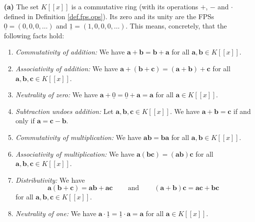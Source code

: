 \begin{theorem}
\label{thm.fps.ring}\textbf{(a)} The set $K\left[  \left[  x\right]  \right]
$ is a commutative ring (with its operations $+$, $-$ and $\cdot$ defined in
Definition \ref{def.fps.ops}). Its zero and its unity are the FPSs
$\underline{0}=\left(  0,0,0,\ldots\right)  $ and $\underline{1}=\left(
1,0,0,0,\ldots\right)  $. This means, concretely, that the following facts hold:

\begin{enumerate}
\item \emph{Commutativity of addition:} We have $\mathbf{a}+\mathbf{b}%
=\mathbf{b}+\mathbf{a}$ for all $\mathbf{a},\mathbf{b}\in K\left[  \left[
x\right]  \right]  $.

\item \emph{Associativity of addition:} We have $\mathbf{a}+\left(
\mathbf{b}+\mathbf{c}\right)  =\left(  \mathbf{a}+\mathbf{b}\right)
+\mathbf{c}$ for all $\mathbf{a},\mathbf{b},\mathbf{c}\in K\left[  \left[
x\right]  \right]  $.

\item \emph{Neutrality of zero:} We have $\mathbf{a}+\underline{0}%
=\underline{0}+\mathbf{a}=\mathbf{a}$ for all $\mathbf{a}\in K\left[  \left[
x\right]  \right]  $.

\item \emph{Subtraction undoes addition:} Let $\mathbf{a},\mathbf{b}%
,\mathbf{c}\in K\left[  \left[  x\right]  \right]  $. We have $\mathbf{a}%
+\mathbf{b}=\mathbf{c}$ if and only if $\mathbf{a}=\mathbf{c}-\mathbf{b}$.

\item \emph{Commutativity of multiplication:} We have $\mathbf{ab}%
=\mathbf{ba}$ for all $\mathbf{a},\mathbf{b}\in K\left[  \left[  x\right]
\right]  $.

\item \emph{Associativity of multiplication:} We have $\mathbf{a}\left(
\mathbf{bc}\right)  =\left(  \mathbf{ab}\right)  \mathbf{c}$ for all
$\mathbf{a},\mathbf{b},\mathbf{c}\in K\left[  \left[  x\right]  \right]  $.

\item \emph{Distributivity:} We have%
\[
\mathbf{a}\left(  \mathbf{b}+\mathbf{c}\right)  =\mathbf{ab}+\mathbf{ac}%
\ \ \ \ \ \ \ \ \ \ \text{and}\ \ \ \ \ \ \ \ \ \ \left(  \mathbf{a}%
+\mathbf{b}\right)  \mathbf{c}=\mathbf{ac}+\mathbf{bc}%
\]
for all $\mathbf{a},\mathbf{b},\mathbf{c}\in K\left[  \left[  x\right]
\right]  $.

\item \emph{Neutrality of one:} We have $\mathbf{a}\cdot\underline{1}%
=\underline{1}\cdot\mathbf{a}=\mathbf{a}$ for all $\mathbf{a}\in K\left[
\left[  x\right]  \right]  $.


\end{enumerate}
\end{theorem}
